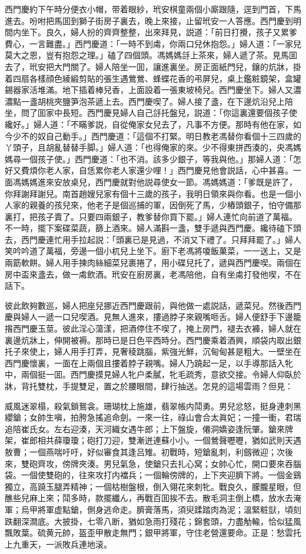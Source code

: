 西門慶約下午時分便衣小帽，带着眼紗，玳安棋童兩個小廝跟隨，逕到門首，下馬進去。吩咐把馬囬到獅子街房子裏去，晚上來接，止留玳安一人答應。西門慶到明間内坐下。良久，婦人扮的齊齊整整，出來拜見，説道：「前日打攪，孩子又累爹費心，一言難盡。」西門慶道：「一時不到䖏，你兩口兒休抱怨。」婦人道：「一家兒莫大之恩，豈有抱怨之理。」磕了四個頭。馮媽媽㧱上茶來，婦人遞了茶。見馬囬去了，玳安把大門關了。婦人陪坐一囬，讓進裏坐。房正面紙門兒，鑲的炕牀，掛着四扇各樣顔色綾緞剪貼的張生遇鶯鶯、蜂蝶花香的弔屏兒，桌上鑑粧鏡架，盒罐錫器家活堆滿。地下插着棒兒香，上面設着一張東坡椅兒。西門慶坐下。婦人又濃濃點一盞胡桃夾鹽笋泡茶遞上去。西門慶喫了。婦人接了盞，在下邊炕沿兒上陪坐，問了囬家中長短。西門慶見婦人自己㧱托盤兒，説道：「你這裏還要個孩子使纔好。」婦人道：「不瞞爹説，自從俺家女兒去了，凡事不方便。那時有他在家，如今少不的奴自己動手。」西門慶道：「這個不打緊。明日教老馮替你看個十三四歲的丫頭子，且胡亂替替手脚。」婦人道：「也得俺家的來。少不得東拼西湊的，央馮媽媽尋一個孩子使。」西門慶道：「也不消。該多少銀子，等我與他。」那婦人道：「怎好又費煩你老人家，自恁累你老人家還少哩！」西門慶見他會説話，心中甚喜。一面馮媽媽進來安放桌兒，西門慶就對他説尋使女一節。馮媽媽道：「爹既是許了，你拜謝拜謝兒。南首趙嫂兒家有個十三歲的孩子，我明日領來與你看。也是一個小人家的親養的孩兒來，他老子是個巡捕的軍，因倒死了馬，少樁頭銀子，怕守備那裏打，把孩子賣了。只要四兩銀子，教爹替你買下罷。」婦人連忙向前道了萬福。不一時，擺下案碟菜蔬，篩上酒來。婦人滿斟一盞，雙手遞與西門慶。纔待磕下頭去，西門慶連忙用手拉起説：「頭裏已是見過，不消又下禮了。只拜拜罷了。」婦人笑吟吟道了萬福，旁邊一個小杌兒上坐下。廚下老馮將嗄飯菓菜，一一送上，又是兩筯軟餅。婦人用手揀肉絲細菜兒裹捲了，用小碟兒托了，遞與西門慶喫。兩個在房中盃來盞去，做一䖏飲酒。玳安在廚房裏，老馮陪他，自有坐䖏打發他喫，不在話下。

彼此飲夠數巡，婦人把座兒挪近西門慶跟前，與他做一處説話，遞菜兒。然後西門慶與婦人一遞一口兒喫酒。見無人進來，摟過脖子來親嘴咂舌。婦人便舒手下邊籠揝西門慶玉莖。彼此淫心蕩漾，把酒停住不喫了，掩上房門，褪去衣褲，婦人就在裏邊炕牀上，伸開被褥。那時已是日色平西時分。西門慶乘着酒興，順袋内取出銀托子來使上，婦人用手打弄，見奢稜跳腦，紫強光鮮，沉甸甸甚是粗大。一壁坐在西門慶懷裏，一面在上兩個且摟着脖子親嘴。婦人乃蹺起一足，以手導那話入牝中，兩個挺一囬。西門慶摸見婦人牝户柔膩，牝毛疏秀，意欲交接。令婦人仰臥於牀，背托雙枕，手提雙足，置之於腰眼間，肆行抽送。怎見的這場雲雨？但見：

威風迷翠榻，殺氣鎖鴛衾。珊瑚枕上施雄，翡翠帳内鬦勇。男兒忿怒，挺身連刺黑纓鎗；女帥生嗔，拍胯急搖追命劍。一來一往，祿山會合太眞妃；一撞一衝，君瑞追陪崔氏女。左右迎湊，天河織女遇牛郎；上下盤旋，僊洞嬌姿逢阮肇。鎗來牌架，崔郎相共薛瓊瓊；砲打刀迎，雙漸迸連蘇小小。一個鶯聲嚦嚦，猶如武則天遇敖曹；一個燕喘吁吁，好似審食其逢吕雉。初戰時，短鎗亂刺，利劔微迎；次後來，雙砲齊攻，傍牌夾湊。男兒氣急，使鎗只去扎心窝；女帥心忙，開口要來吞腦袋。一個使雙砲的，往來攻打内襠兵；一個輪傍牌的，上下夾迎臍下將。一個金鷄獨立，高蹺玉腿弄精神；一個枯樹盤根，倒入翎花來刺牝。戰良久，朦朧星眼，但醮些兒麻上來；鬦多時，款擺纖ん，再戰百囬挨不去。散毛洞主倒上橋，放水去淹軍；烏甲將軍虚點鎗，側身逃命走。臍膏落馬，須臾蹂踏肉為泥；溫緊粧獃，頃刻跌翻深澗底。大披掛，七零八断，猶如急雨打殘花；錦套頭，力盡觔輸，恰似猛風飄敗葉。硫黄元帥，盔歪甲散走無門；銀甲將軍，守住老營還要命。正是：愁雲托上九重天，一派敗兵連地滚。

